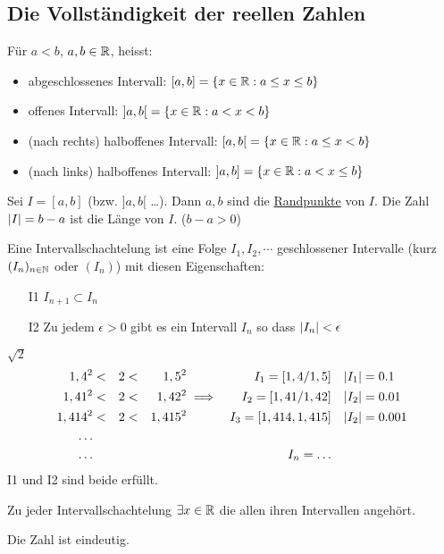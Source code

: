 \subsection{Die Vollständigkeit der reellen Zahlen}
Für $a<b$, $a,b\in\mathbb{R}$, heisst:
\begin{itemize}
  \item abgeschlossenes Intervall: $\left[ a,b \right]=\left\{ x\in\mathbb{R}: a\leq x\leq b \right\}$ 
  \item offenes Intervall: $\left] a,b \right[=\left\{ x\in\mathbb{R}: a< x< b \right\}$
  \item (nach rechts) halboffenes Intervall: $\left[ a,b \right[=\left\{ x\in\mathbb{R}: a\leq x< b \right\}$
  \item (nach links) halboffenes Intervall: $\left] a,b \right]=\left\{ x\in\mathbb{R}: a< x\leq b \right\}$
\end{itemize}
Sei $I=[a,b]$ (bzw. $]a,b[$ \ldots). Dann $a,b$ sind die \underline{Randpunkte} von $I$. Die Zahl $\mathopen| I \mathclose|=b-a$ ist die Länge von $I$. ($b-a>0$)
\begin{Def}
  Eine Intervallschachtelung ist eine Folge $I_1, I_2,\cdots$ geschlossener Intervalle (kurz $(I_n)_{n\in\mathbb{N}}$ oder $(I_n)$) mit diesen Eigenschaften:
  \begin{itemize}
    \item[I1] $I_{n+1}\subset I_n$
    \item[I2] Zu jedem $\epsilon >0$ gibt es ein Intervall $I_n$ so dass $\mathopen| I_n \mathclose| < \epsilon$
  \end{itemize}
\end{Def}
\begin{Bsp}
  $\sqrt{2}$
  \begin{align*}
    1,4^2 & < & 2 & < & 1,5^2 & & I_1 = \left[ 1,4 / 1,5 \right] &\quad \mathopen| I_1 \mathclose| = 0.1\\
    1,41^2 & < & 2 & < & 1,42^2 & \implies & I_2 = \left[ 1,41 / 1,42 \right] &\quad \mathopen| I_2 \mathclose| = 0.01\\
    1,414^2 & < & 2 & < & 1,415^2 & & I_3 = \left[ 1,414, 1,415 \right] &\quad \mathopen| I_2 \mathclose| = 0.001\\
\ldots\\
\ldots &&&&&& I_n = \ldots
  \end{align*}
I1 und I2 sind beide erf\"ullt.
\end{Bsp}
\begin{Axi}
  Zu jeder Intervallschachtelung $\exists x\in\mathbb{R}$ die allen ihren Intervallen angeh\"ort.
\end{Axi}
\begin{Sat}\label{s:Int_Ein}
  Die Zahl ist eindeutig.
\end{Sat}
